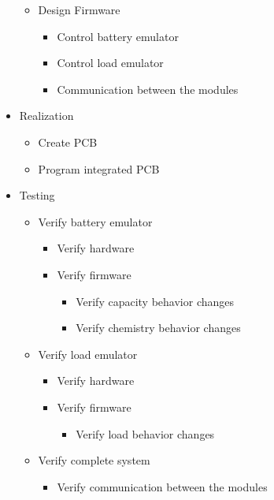 \begin{itemize}
\begin{itemize}
\begin{itemize}
        \end{itemize}
        \item Design Firmware
        \begin{itemize}
            \item Control battery emulator 
            \item Control load emulator 
            \item Communication between the modules
        \end{itemize}
    \end{itemize}
    \item Realization
    \begin{itemize}
        \item Create PCB 
        \item Program integrated PCB 
    \end{itemize}
    \item Testing 
    \begin{itemize}
        \item Verify battery emulator 
        \begin{itemize}
            \item Verify hardware 
            \item Verify firmware 
            \begin{itemize}
                \item Verify capacity behavior changes 
                \item Verify chemistry behavior changes 
            \end{itemize}
        \end{itemize}
        \item Verify load emulator 
        \begin{itemize}
            \item Verify hardware
            \item Verify firmware 
            \begin{itemize}
                \item Verify load behavior changes 
            \end{itemize}
        \end{itemize}
        \item Verify complete system 
        \begin{itemize}
            \item Verify communication between the modules
        \end{itemize}
    \end{itemize}
\end{itemize}